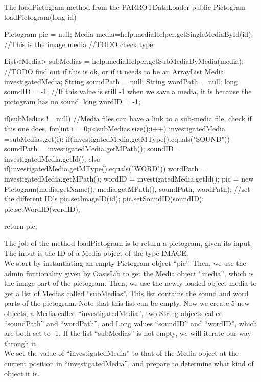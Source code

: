 \begin{source}[{lp}]{The loadPictogram method from the PARROTDataLoader}
	public Pictogram loadPictogram(long id)
	{
		Pictogram pic = null;
		Media media=help.mediaHelper.getSingleMediaById(id); //This is the image media //TODO check type

		List<Media> subMedias =	help.mediaHelper.getSubMediaByMedia(media); //TODO find out if this is ok, or if it needs to be an ArrayList
		Media investigatedMedia;
		String soundPath = null;
		String wordPath = null;
		long soundID = -1; //If this value is still -1 when we save a media, it is because the pictogram has no sound.
		long wordID = -1;

		if(subMedias != null)	//Media files can have a link to a sub-media file, check if this one does.
		{
			for(int i = 0;i<subMedias.size();i++) 		
			{
				investigatedMedia =subMedias.get(i);
				if(investigatedMedia.getMType().equals("SOUND"))
				{
					soundPath = investigatedMedia.getMPath();
					soundID= investigatedMedia.getId();
				}
				else if(investigatedMedia.getMType().equals("WORD"))
				{
					wordPath = investigatedMedia.getMPath();
					wordID = investigatedMedia.getId();
				}
			}
		}
		pic = new Pictogram(media.getName(), media.getMPath(), soundPath, wordPath);
		//set the different ID's
		pic.setImageID(id);
		pic.setSoundID(soundID);
		pic.setWordID(wordID);

		return pic;
	}

\end{source}
The job of the method loadPictogram is to return a pictogram, given its input. The input is the ID of a Media object of the type IMAGE.\\
We start by instantiating an empty Pictogram object ``pic''.\newline
Then, we use the admin funtionality given by OasisLib to get the Media object ``media'', which is the image part of the pictogram.
Then, we use the newly loaded object media to get a list of Medias called ``subMedias''.
This list contains the sound and word parts of the pictogram.
Note that this list can be empty.\newline
Now we create 5 new objects, a Media called ``investigatedMedia'', two String objects called ``soundPath'' and ``wordPath'', and Long values ``soundID'' and ``wordID'', which are both set to -1.
If the list ``subMedias'' is not empty, we will iterate our way through it.\\
We set the value of ``investigatedMedia'' to that of the Media object at the current position in ``investigatedMedia'', and prepare to determine what kind of object it is.
